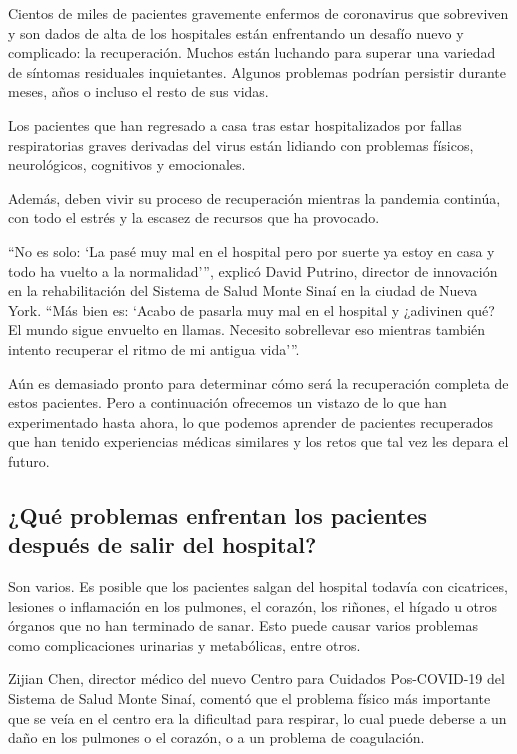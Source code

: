 Cientos de miles de pacientes gravemente enfermos de coronavirus que
sobreviven y son dados de alta de los hospitales están enfrentando un
desafío nuevo y complicado: la recuperación. Muchos están luchando para
superar una variedad de síntomas residuales inquietantes. Algunos
problemas podrían persistir durante meses, años o incluso el resto de
sus vidas.

Los pacientes que han regresado a casa tras estar hospitalizados por
fallas respiratorias graves derivadas del virus están lidiando con
problemas físicos, neurológicos, cognitivos y emocionales.

Además, deben vivir su proceso de recuperación mientras la pandemia
continúa, con todo el estrés y la escasez de recursos que ha provocado.

``No es solo: `La pasé muy mal en el hospital pero por suerte ya estoy
en casa y todo ha vuelto a la normalidad''', explicó David Putrino,
director de innovación en la rehabilitación del Sistema de Salud Monte
Sinaí en la ciudad de Nueva York. ``Más bien es: `Acabo de pasarla muy
mal en el hospital y ¿adivinen qué? El mundo sigue envuelto en llamas.
Necesito sobrellevar eso mientras también intento recuperar el ritmo de
mi antigua vida'''.

Aún es demasiado pronto para determinar cómo será la recuperación
completa de estos pacientes. Pero a continuación ofrecemos un vistazo de
lo que han experimentado hasta ahora, lo que podemos aprender de
pacientes recuperados que han tenido experiencias médicas similares y
los retos que tal vez les depara el futuro.

\hypertarget{quuxe9-problemas-enfrentan-los-pacientes-despuuxe9s-de-salir-del-hospital}{%
\subsection{¿Qué problemas enfrentan los pacientes después de salir del
hospital?}\label{quuxe9-problemas-enfrentan-los-pacientes-despuuxe9s-de-salir-del-hospital}}

Son varios. Es posible que los pacientes salgan del hospital todavía con
cicatrices, lesiones o inflamación en los pulmones, el corazón, los
riñones, el hígado u otros órganos que no han terminado de sanar. Esto
puede causar varios problemas como complicaciones urinarias y
metabólicas, entre otros.

Zijian Chen, director médico del nuevo Centro para Cuidados Pos-COVID-19
del Sistema de Salud Monte Sinaí, comentó que el problema físico más
importante que se veía en el centro era la dificultad para respirar, lo
cual puede deberse a un daño en los pulmones o el corazón, o a un
problema de coagulación.

